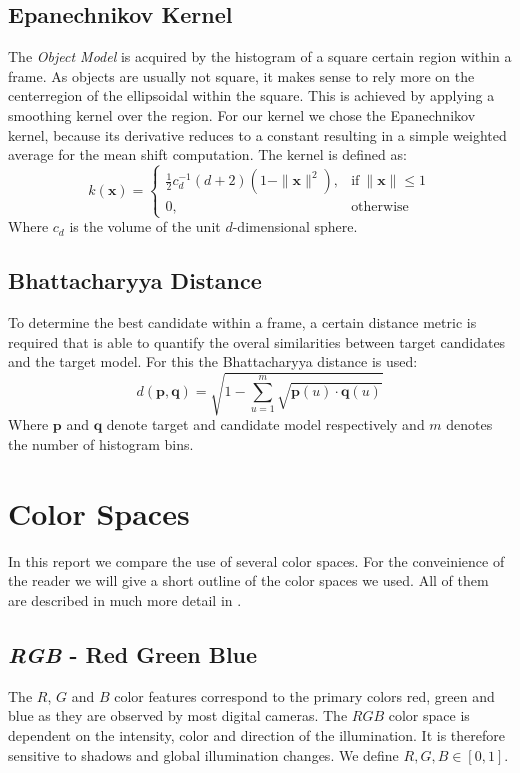 \documentclass[11pt]{article}
\begin{document}
\subsection{Epanechnikov Kernel}
The \emph{Object Model} is acquired by the histogram of a square certain region
within a frame. As objects are usually not square, it makes sense to rely more
on the centerregion of the ellipsoidal within the square. This is achieved by
applying a smoothing kernel over the region. For our kernel we chose the
Epanechnikov kernel, because its derivative reduces to a constant resulting in
a simple weighted average for the mean shift computation. The kernel is defined
as:
\begin{equation}
k(\mathbf{x}) = \left\{
\begin{array}{ll}
\frac{1}{2}c^{-1}_d(d+2)(1-\|\mathbf{x}\|^2), & \textrm{if}~\|\mathbf{x}\| \leq 1 \\
0, & \textrm{otherwise}
\end{array}
\right.
\end{equation}
Where $c_d$ is the volume of the unit $d$-dimensional sphere.

\subsection{Bhattacharyya Distance}
To determine the best candidate within a frame, a certain distance metric is
required that is able to quantify the overal similarities between target
candidates and the target model. For this the Bhattacharyya distance is used:
\begin{equation}
d(\mathbf{p},\mathbf{q}) = \sqrt{1 - \sum^m_{u=1} \sqrt{\mathbf{p}(u) \cdot \mathbf{q}(u)}}
\end{equation}
Where $\mathbf{p}$ and $\mathbf{q}$ denote target and candidate model respectively and $m$
denotes the number of histogram bins.

\section{Color Spaces} \label{sec:color}
In this report we compare the use of several color spaces. For the conveinience
of the reader we will give a short outline of the color spaces we used. All of
them are described in much more detail in \cite{Gevers}.

\subsection{\textit{RGB} - Red Green Blue}
The $R$, $G$ and $B$  color features correspond to the primary colors red,
green and blue as they are observed by most digital cameras. The
$RGB$ color space is dependent on the intensity, color and direction of the
illumination. It is therefore sensitive to shadows and global illumination
changes. We define $R, G, B \in [0,1]$.
\end{document}
